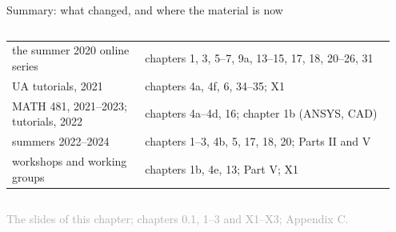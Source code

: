 \documentclass[aspectratio=169,11pt]{beamer}
\newcommand{\sourcecredit}[1]{\vfill\begin{flushright}\tiny\textcolor{DarkGray}{#1}\end{flushright}}
\begin{document}
\begin{frame}{Summary: what changed, and where the material is now}
\begin{columns}[T,onlytextwidth]
\begin{column}{0.53\textwidth}
\begin{tabular}{@{}L{0.33\linewidth}L{0.62\linewidth}@{}}
the summer 2020 online series & chapters 1, 3, 5--7, 9a, 13--15, 17, 18, 20--26, 31 \\
UA tutorials, 2021 & chapters 4a, 4f, 6, 34--35; X1 \\
MATH 481, 2021--2023; tutorials, 2022 & chapters 4a--4d, 16; chapter 1b (ANSYS, CAD) \\
summers 2022--2024 & chapters 1--3, 4b, 5, 17, 18, 20; Parts II and V \\
workshops and working groups & chapters 1b, 4e, 13; Part V; X1 \\
\bottomrule
\end{tabular}
\end{column}
\end{columns}
\sourcecredit{The slides of this chapter; chapters 0.1, 1--3 and X1--X3; Appendix C.}
\end{frame}
\end{document}
